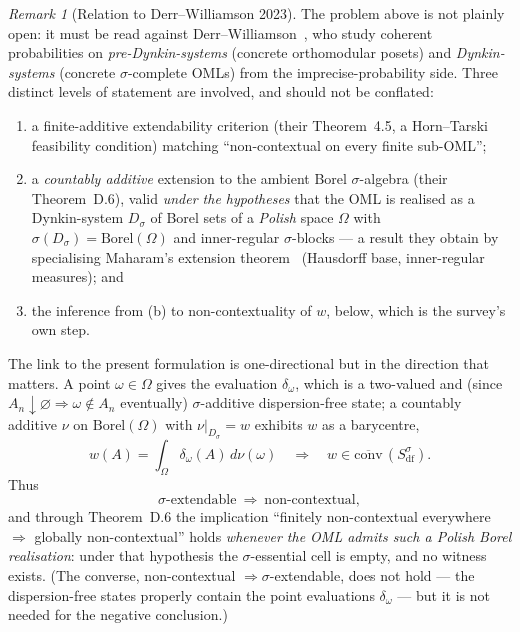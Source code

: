 \documentclass[11pt,reqno]{amsart}
\theoremstyle{plain}
\theoremstyle{definition}
\theoremstyle{remark}
\newtheorem{remark}[theorem]{Remark}
\begin{document}
\begin{remark}[Relation to Derr--Williamson 2023]\label{rem:dw}
The problem above is not plainly open: it must be read against
Derr--Williamson~\cite{DerrWilliamson2023}, who study coherent probabilities on
\emph{pre-Dynkin-systems} (concrete orthomodular posets) and \emph{Dynkin-systems}
(concrete $\sigma$-complete OMLs) from the imprecise-probability side. Three distinct
levels of statement are involved, and should not be conflated:
\begin{enumerate}[label=(\alph*), noitemsep, topsep=2pt]
  \item a finite-additive extendability criterion (their Theorem~4.5, a Horn--Tarski
    feasibility condition) matching ``non-contextual on every finite sub-OML'';
  \item a \emph{countably additive} extension to the ambient Borel $\sigma$-algebra
    (their Theorem~D.6), valid \emph{under the hypotheses} that the OML is realised
    as a Dynkin-system $D_\sigma$ of Borel sets of a \emph{Polish} space $\Omega$
    with $\sigma(D_\sigma)=\mathrm{Borel}(\Omega)$ and inner-regular $\sigma$-blocks
    --- a result they obtain by specialising
    Maharam's extension theorem~\cite[Thm~8.1]{Maharam1972} (Hausdorff base,
    inner-regular measures); and
  \item the inference from (b) to non-contextuality of $w$, below, which is the
    survey's own step.
\end{enumerate}

The link to the present formulation is one-directional but in the direction that
matters. A point $\omega\in\Omega$ gives the evaluation $\delta_\omega$, which is a
two-valued and (since $A_n\downarrow\varnothing\Rightarrow\omega\notin A_n$
eventually) $\sigma$-additive dispersion-free state; a countably additive $\nu$ on
$\mathrm{Borel}(\Omega)$ with $\nu|_{D_\sigma}=w$ exhibits $w$ as a barycentre,
\[
  w(A)=\int_\Omega \delta_\omega(A)\,d\nu(\omega)
  \quad\Longrightarrow\quad
  w\in\overline{\mathrm{conv}}\,(S_{\mathrm{df}}^\sigma).
\]
Thus
\[
  \text{$\sigma$-extendable}\ \Longrightarrow\ \text{non-contextual},
\]
and through Theorem~D.6 the implication
``finitely non-contextual everywhere $\Rightarrow$ globally non-contextual'' holds
\emph{whenever the OML admits such a Polish Borel realisation}: under that
hypothesis the $\sigma$-essential cell is empty, and no witness exists. (The converse,
non-contextual $\Rightarrow\sigma$-extendable, does not hold --- the
dispersion-free states properly contain the point evaluations $\delta_\omega$ --- but
it is not needed for the negative conclusion.)


\end{remark}
\end{document}
